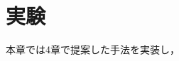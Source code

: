\documentclass[a4paper, 12pt, dvipdfmx, uplatex]{jsreport}
\begin{document}
\chapter{実験}
本章では4章で提案した手法を実装し，



\end{document}
